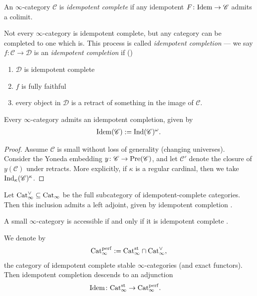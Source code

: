\begin{definition} An $\infty$-category $\mathscr{C}$ is \textit{idempotent complete} if any idempotent $F \colon \mathrm{Idem} \to \mathscr{C}$ admits a colimit.
\end{definition}

Not every $\infty$-category is idempotent complete, but any category can be completed to one which is. This process is called \textit{idempotent completion} --- we say $f \colon \mathscr{C} \to \mathscr{D}$ is an \textit{idempotent completion} if (\cite[5.1.4.1]{HTT})
\begin{enumerate}
    \item $\mathscr{D}$ is idempotent complete
    \item $f$ is fully faithful
    \item every object in $\mathscr{D}$ is a retract of something in the image of $\mathscr{C}$.
\end{enumerate}

\begin{proposition} \cite[5.1.4.2,~5.4.2.4]{HTT} Every $\infty$-category admits an idempotent completion, given by
\begin{align*}
    \mathrm{Idem}(\mathscr{C}) := \mathrm{Ind}(\mathscr{C})^\omega.
\end{align*}
\end{proposition}
\begin{proof} Assume $\mathscr{C}$ is small without loss of generality (changing universes). Consider the Yoneda embedding $y \colon \mathscr{C} \to \mathrm{Pre}(\mathscr{C})$, and let $\mathscr{C}'$ denote the closure of $y(\mathscr{C})$ under retracts. More explicitly, if $\kappa$ is a regular cardinal, then we take $\mathrm{Ind}_\kappa(\mathscr{C})^\kappa$.
\end{proof}

Let $\mathrm{Cat}_\infty^\vee \subseteq \mathrm{Cat}_\infty$ be the full subcategory of idempotent-complete categories. Then this inclusion admits a left adjoint, given by idempotent completion \cite[5.4.2.18]{HTT}.

\begin{proposition} A small $\infty$-category is accessible if and only if it is idempotent complete \cite[5.4.3.?]{HTT}.
\end{proposition}

We denote by
\begin{align*}
    \mathrm{Cat}_\infty^{\mathrm{perf}} := \mathrm{Cat}_\infty^{\mathrm{st}} \cap \mathrm{Cat}_\infty^\vee,
\end{align*}
the category of idempotent complete stable $\infty$-categories (and exact functors). Then idempotent completion descends to an adjunction
\begin{align*}
    \mathrm{Idem} \colon \mathrm{Cat}_\infty^{\mathrm{st}} &\to \mathrm{Cat}_\infty^{\mathrm{perf}}.
\end{align*}



